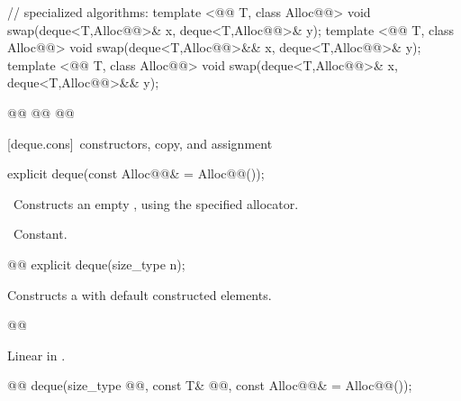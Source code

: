 \documentclass[american,twoside]{book}
\begin{document}
\begin{codeblock}
{  // specialized algorithms:
  template <@@ T, class Alloc@@>
    void swap(deque<T,Alloc@@>& x, deque<T,Alloc@@>& y);
  template <@@ T, class Alloc@@>
    void swap(deque<T,Alloc@@>&& x, deque<T,Alloc@@>& y);
  template <@@ T, class Alloc@@>
    void swap(deque<T,Alloc@@>& x, deque<T,Alloc@@>&& y);

  @@
    @@
      @@
}
\end{codeblock}

[deque.cons]{\ constructors, copy, and assignment}

\begin{itemdecl}
explicit deque(const Alloc@@& = Alloc@@());
\end{itemdecl}

\begin{itemdescr}
\pnum
\effects\ 
Constructs an empty
,
using the specified allocator.

\pnum
\complexity\ 
Constant.
\end{itemdescr}

\begin{itemdecl}
@@ explicit deque(size_type n);
\end{itemdecl}

\begin{itemdescr}
\pnum
\effects Constructs a  with
 default constructed elements.

\pnum
@@

\pnum
\complexity Linear in .
\end{itemdescr}

\begin{itemdecl}
@@
deque(size_type @@, const T& @@,
      const Alloc@@& = Alloc@\removedConcepts{ator}@());
\end{itemdecl}
\end{document}

